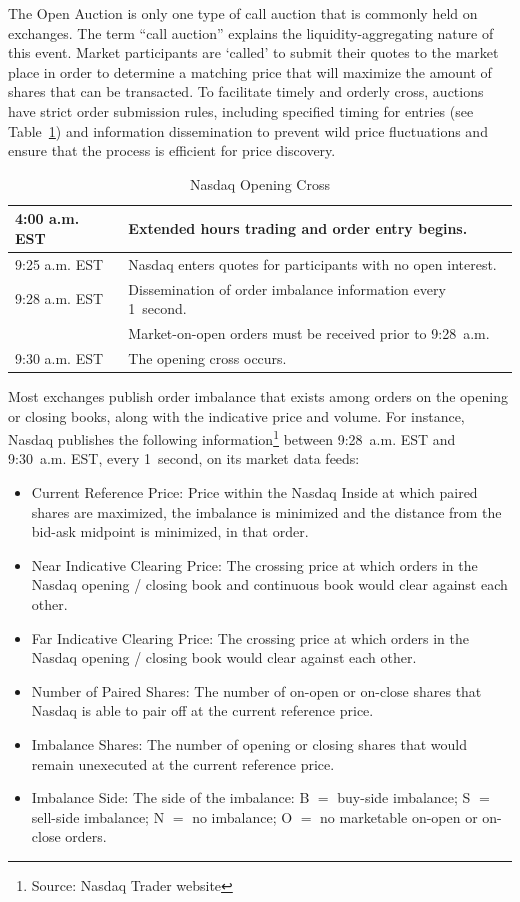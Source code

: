 The Open Auction is only one type of call auction that is commonly held on exchanges. The term ``call auction'' explains the liquidity-aggregating nature of this event. Market participants are `called' to submit their quotes to the market place in order to determine a matching price that will maximize the amount of shares that can be transacted. To facilitate timely and orderly cross, auctions have strict order submission rules, including specified timing for entries (see Table~\ref{tab:NASDAQopen}) and information dissemination to prevent wild price fluctuations and ensure that the process is efficient for price discovery.
        \begin{table}[!ht]
        \centering
        \caption{Nasdaq Opening Cross \label{tab:NASDAQopen}}
        \begin{tabular}{ll} 
        	4:00 a.m. EST & Extended hours trading and order entry begins.  \\ \hline
        	9:25 a.m. EST & Nasdaq enters quotes for participants with no open interest. \\ \hline
        	9:28 a.m. EST & Dissemination of order imbalance information every 1~second.  \\ 
        	 & Market-on-open orders must be received prior to 9:28~a.m.   \\ \hline	
        	9:30 a.m. EST & The opening cross occurs.		
        \end{tabular}
        \end{table}	


Most exchanges publish order imbalance that exists among orders on the opening or closing books, along with the indicative price and volume. For instance, Nasdaq publishes the following information\footnote{Source: Nasdaq Trader website} between 9:28~a.m. EST and 9:30~a.m. EST,  every 1~second, on its market data feeds:
        \begin{itemize}
        \item  Current Reference Price: Price within the Nasdaq Inside at which paired shares are maximized, the imbalance is minimized and the distance from the bid-ask midpoint is minimized, in that order.
        \item  Near Indicative Clearing Price: The crossing price at which orders in the Nasdaq opening / closing book and continuous book would clear against each other. 
        \item  Far Indicative Clearing Price: The crossing price at which orders in the Nasdaq opening / closing book would clear against each other. 
        \item  Number of Paired Shares: The number of on-open or on-close shares that Nasdaq is able to pair off at the current reference price. 
        \item  Imbalance Shares: The number of opening or closing shares that would remain unexecuted at the current reference price. 
        \item  Imbalance Side: The side of the imbalance: B $=$ buy-side imbalance; S $=$ sell-side imbalance; N $=$ no imbalance; O $=$ no marketable on-open or on-close orders.
        \end{itemize}

